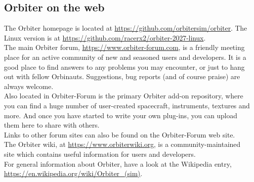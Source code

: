 \documentclass[Orbiter User Manual.tex]{subfiles}
\begin{document}
\subsection{Orbiter on the web}
The Orbiter homepage is located at \url{https://github.com/orbitersim/orbiter}. The Linux version is at \url{https://github.com/racerx2/orbiter-2027-linux}.\\
The main Orbiter forum, \url{https://www.orbiter-forum.com}, is a friendly meeting place for an active community of new and seasoned users and developers. It is a good place to find answers to any problems you may encounter, or just to hang out with fellow Orbinauts. Suggestions, bug reports (and of course praise) are always welcome.\\
Also located in Orbiter-Forum is the primary Orbiter add-on repository, where you can find a huge number of user-created spacecraft, instruments, textures and more. And once you have started to write your own plug-ins, you can upload them here to share with others.\\
Links to other forum sites can also be found on the Orbiter-Forum web site.\\
The Orbiter wiki, at \url{https://www.orbiterwiki.org}, is a community-maintained site which contains useful information for users and developers.\\
For general information about Orbiter, have a look at the Wikipedia entry, \url{https://en.wikipedia.org/wiki/Orbiter_(sim)}.
\end{document}
